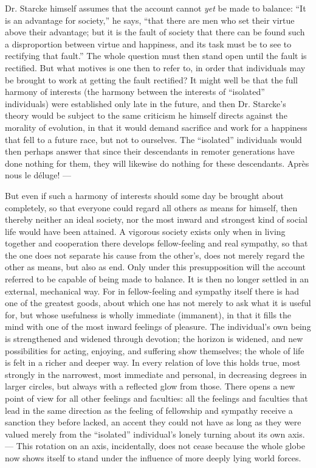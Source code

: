 \documentclass[12pt,a4paper,openany]{book}
\newcommand{\opage}[1]{\marginnote{\footnotesize\textit{[#1]}}}
\begin{document}
Dr. Starcke himself assumes that the account cannot \emph{yet}
be made to balance: ``It is an advantage for society,''
he says, ``that there are men who set their virtue
above their advantage; but it is the fault of society that there can
be found such a disproportion between virtue and happiness, and its
task must be to see to rectifying that fault.'' The whole
question must then stand open until the fault is rectified. But what
motives is one then to refer to, in order that individuals may
be brought to work at getting the fault rectified? It might
well be that the full harmony of interests (the harmony between
the interests of ``isolated'' individuals) were established only late in the future,
and then Dr. Starcke's theory would be subject
to the same criticism he himself directs against the morality of evolution,
in that it would demand sacrifice and work for a happiness that
fell to a future race, but not to ourselves. The ``isolated''
individuals would then perhaps answer that since their
descendants in remoter generations have done nothing for them, they will
likewise do nothing for these descendants. Après nous
le déluge! ---

\opage{36}But even if such a harmony of interests should some day
be brought about completely, so that everyone could
regard all others as means for himself, then thereby
neither an ideal society, nor the most inward and strongest
kind of social life would have been attained. A vigorous society
exists only when in living together and cooperation there develops
fellow-feeling and real sympathy, so that the one does not
separate his cause from the other's, does not merely regard the
other as means, but also as end. Only under this
presupposition will the account referred to be capable of being made to
balance. It is then no longer settled in an external,
mechanical way. For in fellow-feeling and sympathy itself there is had
one of the greatest goods, about which one has not merely to ask
what it is useful for, but whose usefulness is wholly immediate
(immanent), in that it fills the mind with one of the most inward
feelings of pleasure. The individual's own being is strengthened and widened
through devotion; the horizon is widened, and new possibilities
for acting, enjoying, and suffering show themselves; the whole of life is felt in
a richer and deeper way. In every relation of love this
holds true, most strongly in the narrowest, most
immediate and personal, in decreasing degrees in larger circles, but
always with a reflected glow from those. There opens a new
point of view for all other feelings and faculties: all the feelings and
faculties that lead in the same direction as the feeling of fellowship and
sympathy receive a sanction they before lacked, an accent they
could not have as long as they were valued merely from the
``isolated'' individual's lonely turning about its own axis. --- This
rotation on an axis, incidentally, does not cease because the whole globe
now shows itself to stand under the influence of more deeply lying
world forces.
\end{document}
